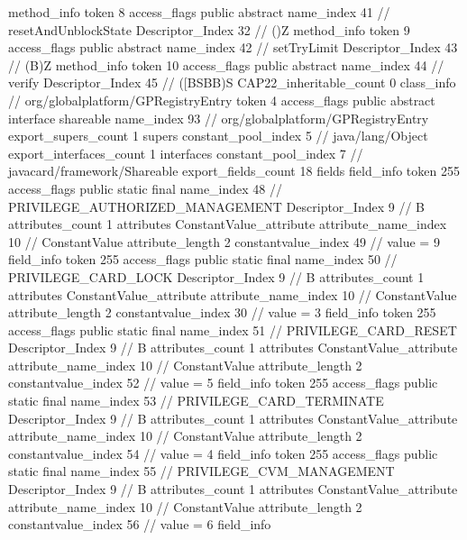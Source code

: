 {{{{{				}
				method_info {
					token	8
					access_flags	public abstract
					name_index	41		// resetAndUnblockState
					Descriptor_Index	32		// ()Z
				}
				method_info {
					token	9
					access_flags	public abstract
					name_index	42		// setTryLimit
					Descriptor_Index	43		// (B)Z
				}
				method_info {
					token	10
					access_flags	public abstract
					name_index	44		// verify
					Descriptor_Index	45		// ([BSBB)S
				}
			}
			CAP22_inheritable_count	0
		}
		class_info {		// org/globalplatform/GPRegistryEntry
			token	4
			access_flags	public abstract interface shareable
			name_index	93		// org/globalplatform/GPRegistryEntry
			export_supers_count	1
			supers {
				constant_pool_index	5		// java/lang/Object
			}
			export_interfaces_count	1
			interfaces {
				constant_pool_index	7		// javacard/framework/Shareable
			}
			export_fields_count	18
			fields {
			field_info {
				token	255
				access_flags	public static final
				name_index	48		// PRIVILEGE_AUTHORIZED_MANAGEMENT
				Descriptor_Index	9		// B
				attributes_count	1
				attributes {
				ConstantValue_attribute {
					attribute_name_index	10		// ConstantValue
					attribute_length	2
					constantvalue_index	49		// value = 9
				}
				}
			}
			field_info {
				token	255
				access_flags	public static final
				name_index	50		// PRIVILEGE_CARD_LOCK
				Descriptor_Index	9		// B
				attributes_count	1
				attributes {
				ConstantValue_attribute {
					attribute_name_index	10		// ConstantValue
					attribute_length	2
					constantvalue_index	30		// value = 3
				}
				}
			}
			field_info {
				token	255
				access_flags	public static final
				name_index	51		// PRIVILEGE_CARD_RESET
				Descriptor_Index	9		// B
				attributes_count	1
				attributes {
				ConstantValue_attribute {
					attribute_name_index	10		// ConstantValue
					attribute_length	2
					constantvalue_index	52		// value = 5
				}
				}
			}
			field_info {
				token	255
				access_flags	public static final
				name_index	53		// PRIVILEGE_CARD_TERMINATE
				Descriptor_Index	9		// B
				attributes_count	1
				attributes {
				ConstantValue_attribute {
					attribute_name_index	10		// ConstantValue
					attribute_length	2
					constantvalue_index	54		// value = 4
				}
				}
			}
			field_info {
				token	255
				access_flags	public static final
				name_index	55		// PRIVILEGE_CVM_MANAGEMENT
				Descriptor_Index	9		// B
				attributes_count	1
				attributes {
				ConstantValue_attribute {
					attribute_name_index	10		// ConstantValue
					attribute_length	2
					constantvalue_index	56		// value = 6
				}
				}
			}
			field_info {
}}}}}
